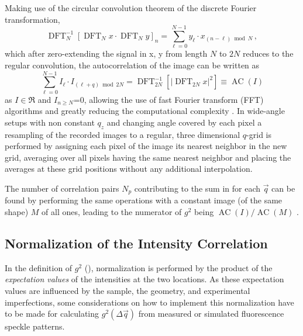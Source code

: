 Making use of the circular convolution theorem of the discrete Fourier transformation,
\begin{equation}
	\operatorname{DFT}_N^{-1}\left[\operatorname{DFT}_N x \cdot \operatorname{DFT}_N y\right]_n=\sum_{\ell=0}^{N-1} y_{\ell} \cdot x_{(n-\ell) \bmod N} \,,
\end{equation}
which after zero-extending the signal in x, y from length $N$ to $2N$ reduces to the regular convolution, the autocorrelation of the image can be written as 
\begin{equation}
	\sum_{\ell=0}^{N-1} I_{\ell} \cdot I_{(\ell+q) \bmod 2N}=\operatorname{DFT}_{2N}^{-1}\left[\left|\operatorname{DFT}_{2N} {x}\right|^2\right]\equiv \operatorname{AC}(I)
	\label{eq:fftcorrelation}
\end{equation} 
as $I\in \Re$ and $I_{n\geq N}$=0, allowing the use of fast Fourier transform (FFT) algorithms and greatly reducing the computational complexity \cite{oppenheim2009}.  In wide-angle setups with non constant $q_z$ and changing angle covered by each pixel a resampling of the recorded images to a regular, three dimensional $q$-grid is performed by assigning each pixel of the image its nearest neighbor in the new grid, averaging over all pixels having the same nearest neighbor and placing the averages at these grid positions without any additional interpolation. 

The number of correlation pairs $N_p$ contributing to the sum in  for each $\vec{q}$ can be found by performing the same operations with a constant image (of the same shape) $M$ of all ones, leading to the numerator of $g^2$ being $\operatorname{AC}(I)/\operatorname{AC}(M)$ \cite{oppenheim2009,butz2015,nion2008}.

\subsection{Normalization of the Intensity Correlation}
\label{sec:normal}
In the definition of $g^2$ (), normalization is performed by the product of the \textit{expectation values} of the intensities at the two locations. As these expectation values are influenced by the sample, the geometry, and experimental imperfections, some considerations on how to implement this normalization have to be made for calculating $g^2(\Delta\vec{q})$ from measured or simulated fluorescence speckle patterns. 

